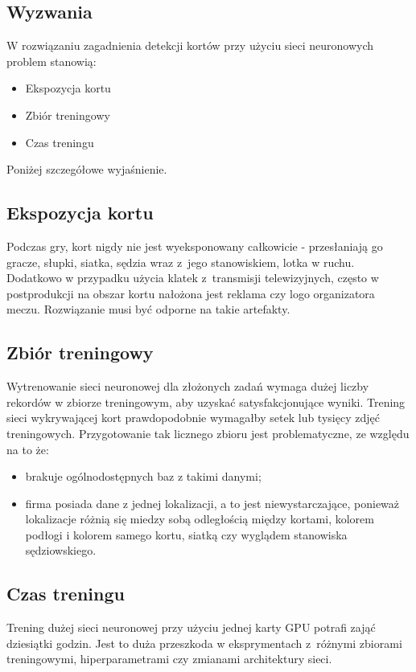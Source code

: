 \subsection{Wyzwania}

W rozwiązaniu zagadnienia detekcji kortów przy użyciu sieci neuronowych problem stanowią:

\begin{itemize}
  \item Ekspozycja kortu
  \item Zbiór treningowy
  \item Czas treningu
\end{itemize}

Poniżej szczegółowe wyjaśnienie.

\subsection*{Ekspozycja kortu}

Podczas gry, kort nigdy nie jest wyeksponowany całkowicie - przesłaniają go gracze, słupki, siatka, sędzia wraz z~jego stanowiskiem, lotka w ruchu.
Dodatkowo w przypadku użycia klatek z~transmisji telewizyjnych, często w postprodukcji na obszar kortu nałożona jest reklama czy logo organizatora meczu.
Rozwiązanie musi być odporne na takie artefakty.

\subsection*{Zbiór treningowy}

Wytrenowanie sieci neuronowej dla złożonych zadań wymaga dużej liczby rekordów w zbiorze treningowym, aby uzyskać satysfakcjonujące wyniki.
Trening sieci wykrywającej kort prawdopodobnie wymagałby setek lub tysięcy zdjęć treningowych.
Przygotowanie tak licznego zbioru jest problematyczne, ze względu na to że:

\begin{itemize}
	\item brakuje ogólnodostępnych baz z takimi danymi;
	\item firma posiada dane z jednej lokalizacji, a to jest niewystarczające, ponieważ lokalizacje różnią się miedzy sobą odległością między kortami, kolorem podłogi i kolorem samego kortu, siatką czy wyglądem stanowiska sędziowskiego.
\end{itemize}

\subsection*{Czas treningu}

Trening dużej sieci neuronowej przy użyciu jednej karty GPU potrafi zająć dziesiątki godzin.
Jest to duża przeszkoda w eksprymentach z~różnymi zbiorami treningowymi, hiperparametrami czy zmianami architektury sieci.
